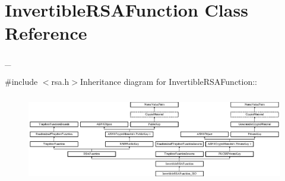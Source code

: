 \hypertarget{class_invertible_r_s_a_function}{
\section{InvertibleRSAFunction Class Reference}
\label{class_invertible_r_s_a_function}
}


\_\-  


{\ttfamily \#include $<$rsa.h$>$}Inheritance diagram for InvertibleRSAFunction::\begin{figure}[H]
\begin{center}
\leavevmode
\includegraphics[height=3.87879cm]{class_invertible_r_s_a_function}
\end{center}
\end{figure}
